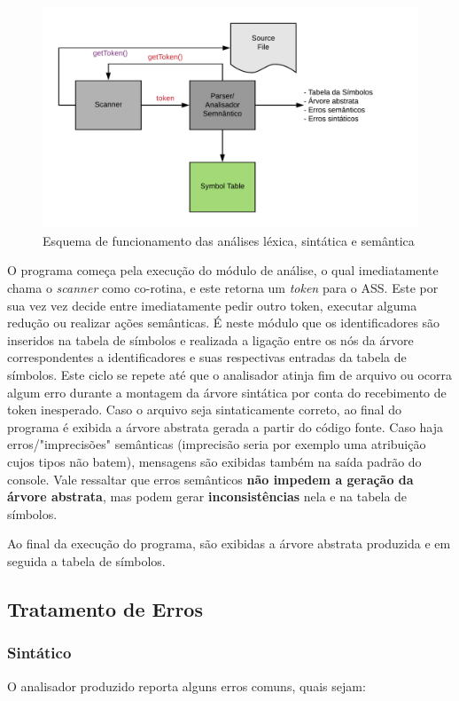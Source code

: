 \documentclass[
	article,			%
	11pt,				%
	oneside,			%
	a4paper,			%
	english,			%
	brazil,				%
	sumario=tradicional
	]{abntex2}
\renewcommand{\it}[1]{\textit{#1}}
\renewcommand{\bf}[1]{\textbf{#1}}
\begin{document}
\begin{figure}[hbt!]
	\caption{Esquema de funcionamento das análises léxica, sintática e semântica}
	\label{esquema}
	\centering
	\includegraphics[scale=0.8]{img/diagrama-tradutores.png}
\end{figure}

O programa começa pela execução do módulo de análise, o qual imediatamente chama o \it{scanner} como co-rotina, e este retorna um \it{token} para o ASS. Este por sua vez vez decide entre
imediatamente pedir outro token, executar alguma redução ou realizar ações semânticas. É neste módulo que os identificadores são inseridos na tabela
de símbolos e realizada a ligação entre os nós da árvore correspondentes a identificadores e suas respectivas entradas da tabela de símbolos. Este ciclo se repete até que o analisador atinja fim de arquivo
ou ocorra algum erro durante a montagem da árvore sintática por conta do recebimento de
token inesperado. Caso o arquivo seja sintaticamente correto, ao final do programa é exibida a árvore abstrata gerada a partir do código fonte. Caso haja erros/"imprecisões" semânticas (imprecisão seria por exemplo uma atribuição cujos tipos não batem), mensagens são exibidas também na saída padrão do console. Vale ressaltar que erros semânticos \bf{não impedem a geração da árvore abstrata}, mas podem gerar \bf{inconsistências} nela e na tabela de símbolos.

Ao final da execução do programa, são exibidas a árvore abstrata produzida e em seguida a tabela de símbolos.

\subsection{Tratamento de Erros}

\subsubsection{Sintático}
O analisador produzido reporta alguns erros comuns, quais sejam:
\end{document}

